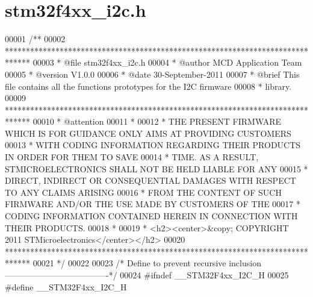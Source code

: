 \section{stm32f4xx\+\_\+i2c.\+h}
\label{stm32f4xx__i2c_8h_source}

\begin{DoxyCode}
00001 \textcolor{comment}{/**}
00002 \textcolor{comment}{  ******************************************************************************}
00003 \textcolor{comment}{  * @file    stm32f4xx\_i2c.h}
00004 \textcolor{comment}{  * @author  MCD Application Team}
00005 \textcolor{comment}{  * @version V1.0.0}
00006 \textcolor{comment}{  * @date    30-September-2011}
00007 \textcolor{comment}{  * @brief   This file contains all the functions prototypes for the I2C firmware }
00008 \textcolor{comment}{  *          library.}
00009 \textcolor{comment}{  ******************************************************************************}
00010 \textcolor{comment}{  * @attention}
00011 \textcolor{comment}{  *}
00012 \textcolor{comment}{  * THE PRESENT FIRMWARE WHICH IS FOR GUIDANCE ONLY AIMS AT PROVIDING CUSTOMERS}
00013 \textcolor{comment}{  * WITH CODING INFORMATION REGARDING THEIR PRODUCTS IN ORDER FOR THEM TO SAVE}
00014 \textcolor{comment}{  * TIME. AS A RESULT, STMICROELECTRONICS SHALL NOT BE HELD LIABLE FOR ANY}
00015 \textcolor{comment}{  * DIRECT, INDIRECT OR CONSEQUENTIAL DAMAGES WITH RESPECT TO ANY CLAIMS ARISING}
00016 \textcolor{comment}{  * FROM THE CONTENT OF SUCH FIRMWARE AND/OR THE USE MADE BY CUSTOMERS OF THE}
00017 \textcolor{comment}{  * CODING INFORMATION CONTAINED HEREIN IN CONNECTION WITH THEIR PRODUCTS.}
00018 \textcolor{comment}{  *}
00019 \textcolor{comment}{  * <h2><center>&copy; COPYRIGHT 2011 STMicroelectronics</center></h2>}
00020 \textcolor{comment}{  ******************************************************************************  }
00021 \textcolor{comment}{  */}
00022 
00023 \textcolor{comment}{/* Define to prevent recursive inclusion -------------------------------------*/}
00024 \textcolor{preprocessor}{#}\textcolor{preprocessor}{ifndef} \textcolor{preprocessor}{\_\_STM32F4xx\_I2C\_H}
00025 \textcolor{preprocessor}{#}\textcolor{preprocessor}{define} \textcolor{preprocessor}{\_\_STM32F4xx\_I2C\_H}

\end{DoxyCode}
